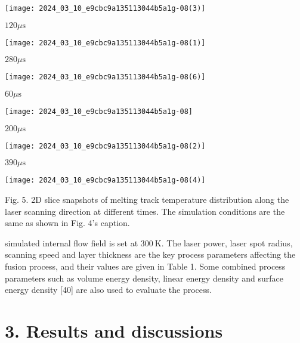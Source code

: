 \documentclass[10pt]{article}
\begin{document}
\begin{center}
\texttt{[image: 2024\_03\_10\_e9cbc9a135113044b5a1g-08(3)]}
\end{center}

$120 \mu \mathrm{s}$

\begin{center}
\texttt{[image: 2024\_03\_10\_e9cbc9a135113044b5a1g-08(1)]}
\end{center}

$280 \mu \mathrm{s}$

\begin{center}
\texttt{[image: 2024\_03\_10\_e9cbc9a135113044b5a1g-08(6)]}
\end{center}

$60 \mu \mathrm{s}$

\begin{center}
\texttt{[image: 2024\_03\_10\_e9cbc9a135113044b5a1g-08]}
\end{center}

$200 \mu \mathrm{s}$

\begin{center}
\texttt{[image: 2024\_03\_10\_e9cbc9a135113044b5a1g-08(2)]}
\end{center}

$390 \mu \mathrm{s}$

\begin{center}
\texttt{[image: 2024\_03\_10\_e9cbc9a135113044b5a1g-08(4)]}
\end{center}

Fig. 5. 2D slice snapshots of melting track temperature distribution along the laser scanning direction at different times. The simulation conditions are the same as shown in Fig. 4's caption.

simulated internal flow field is set at $300 \mathrm{~K}$. The laser power, laser spot radius, scanning speed and layer thickness are the key process parameters affecting the fusion process, and their values are given in Table 1. Some combined process parameters such as volume energy density, linear energy density and surface energy density [40] are also used to evaluate the process.

\section*{3. Results and discussions}
\end{document}
